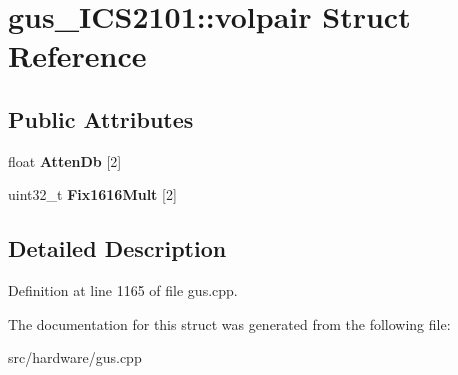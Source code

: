 \hypertarget{structgus__ICS2101_1_1volpair}{\section{gus\-\_\-\-I\-C\-S2101\-:\-:volpair Struct Reference}
\label{structgus__ICS2101_1_1volpair}
}
\subsection*{Public Attributes}
\begin{DoxyCompactItemize}
\item 
\hypertarget{structgus__ICS2101_1_1volpair_a02314a3a3ad17a789bc194f027a55728}{float {\bfseries Atten\-Db} \mbox{[}2\mbox{]}}\label{structgus__ICS2101_1_1volpair_a02314a3a3ad17a789bc194f027a55728}

\item 
\hypertarget{structgus__ICS2101_1_1volpair_a46cbc4d1df89d680f55e3bc2ab41baca}{uint32\-\_\-t {\bfseries Fix1616\-Mult} \mbox{[}2\mbox{]}}\label{structgus__ICS2101_1_1volpair_a46cbc4d1df89d680f55e3bc2ab41baca}

\end{DoxyCompactItemize}


\subsection{Detailed Description}


Definition at line 1165 of file gus.\-cpp.



The documentation for this struct was generated from the following file\-:\begin{DoxyCompactItemize}
\item 
src/hardware/gus.\-cpp\end{DoxyCompactItemize}
